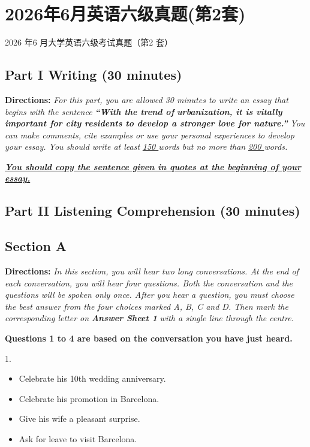 \documentclass[UTF8,11pt]{ctexart}
\begin{document}
\section*{2026年6月英语六级真题(第2套)}
2026 年6 月大学英语六级考试真题（第2 套）


\subsection*{\textbf{Part I Writing} \textbf{(30 minutes)}}


\textbf{Directions:}\textit{ For this part, you are allowed 30 minutes to write an essay that begins with the sentence }\textbf{\textit{“With the trend of}} \textbf{\textit{urbanization, it is vitally important for city residents to develop a stronger love for nature.”}}\textit{ You can make comments,} \textit{cite examples or use your personal experiences to develop your essay. You should write at least }\textit{\uline{150 }}\textit{words but no more} \textit{than }\textit{\uline{200 }}\textit{words.}


\textbf{\textit{\uline{You should copy the sentence given in quotes at the beginning of your essay.}}}


\subsection*{\textbf{Part II} \textbf{Listening Comprehension} \textbf{(30 minutes)}}


\subsection*{\textbf{Section A}}


\textbf{Directions:} \textit{In this section, you will hear two long conversations. At the end of each conversation, you will hear four} \textit{questions. Both the conversation and the questions will be spoken only once. After you hear a question, you must choose} \textit{the best answer from the four choices marked A, B, C and D. Then mark the corresponding letter on }\textbf{\textit{Answer Sheet 1}} \textit{with a single line through the centre.}


\textbf{Questions 1 to 4 are based on the conversation you have just heard.}


1.


\begin{itemize}[leftmargin=2em,itemsep=.2em,topsep=.4em]\item[A.] Celebrate his 10th wedding anniversary.
\item[B.] Celebrate his promotion in Barcelona.
\item[C.] Give his wife a pleasant surprise.
\item[D.] Ask for leave to visit Barcelona.
\end{itemize}
\end{document}

